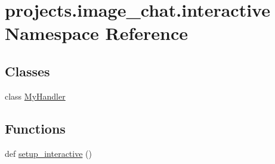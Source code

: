 \hypertarget{namespaceprojects_1_1image__chat_1_1interactive}{}\section{projects.\+image\+\_\+chat.\+interactive Namespace Reference}
\label{namespaceprojects_1_1image__chat_1_1interactive}
\subsection*{Classes}
\begin{DoxyCompactItemize}
\item 
class \hyperlink{classprojects_1_1image__chat_1_1interactive_1_1MyHandler}{My\+Handler}
\end{DoxyCompactItemize}
\subsection*{Functions}
\begin{DoxyCompactItemize}
\item 
def \hyperlink{namespaceprojects_1_1image__chat_1_1interactive_a44c69eb8136c100209f99644e41407b0}{setup\+\_\+interactive} ()
\end{DoxyCompactItemize}
